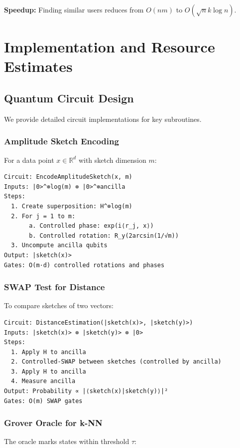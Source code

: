 \documentclass[11pt]{article}
\begin{document}
\textbf{Speedup:} Finding similar users reduces from $O(nm)$ to $O(\sqrt{n}k \log n)$.

\section{Implementation and Resource Estimates}
\label{sec:implementation}

\subsection{Quantum Circuit Design}

We provide detailed circuit implementations for key subroutines.

\subsubsection{Amplitude Sketch Encoding}

For a data point $x \in \mathbb{R}^d$ with sketch dimension $m$:

\begin{verbatim}
Circuit: EncodeAmplitudeSketch(x, m)
Inputs: |0>^⊗log(m) ⊗ |0>^⊗ancilla
Steps:
  1. Create superposition: H^⊗log(m)
  2. For j = 1 to m:
       a. Controlled phase: exp(i⟨r_j, x⟩)
       b. Controlled rotation: R_y(2arcsin(1/√m))
  3. Uncompute ancilla qubits
Output: |sketch(x)>
Gates: O(m·d) controlled rotations and phases
\end{verbatim}

\subsubsection{SWAP Test for Distance}

To compare sketches of two vectors:

\begin{verbatim}
Circuit: DistanceEstimation(|sketch(x)>, |sketch(y)>)
Inputs: |sketch(x)> ⊗ |sketch(y)> ⊗ |0>
Steps:
  1. Apply H to ancilla
  2. Controlled-SWAP between sketches (controlled by ancilla)
  3. Apply H to ancilla
  4. Measure ancilla
Output: Probability ∝ |⟨sketch(x)|sketch(y)⟩|²
Gates: O(m) SWAP gates
\end{verbatim}

\subsubsection{Grover Oracle for k-NN}

The oracle marks states within threshold $\tau$:
\end{document}
